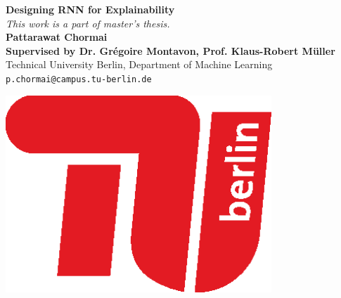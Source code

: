 \documentclass[a0,portrait]{a0poster}
\begin{document}




	\begin{minipage}[b]{0.75\linewidth}
	
	\veryHuge \textbf{Designing RNN for Explainability} \\ %
	\large \textit{This work is a part of master's thesis.}\\[2cm] %
	\huge \textbf{Pattarawat Chormai} \\ [0.5cm]
	\huge \textbf{Supervised by Dr. Gr\'{e}goire Montavon, Prof. Klaus-Robert M\"{u}ller} \\[0.5cm] %
	\huge Technical University Berlin, Department of Machine Learning \\[0.4cm] %
	\Large \texttt{p.chormai@campus.tu-berlin.de} \\
	\end{minipage}
	\begin{minipage}[b]{0.25\linewidth}
	\includegraphics[width=10cm]{tub-logo}\\
	\end{minipage}


\vspace{1cm} %
\end{document}
